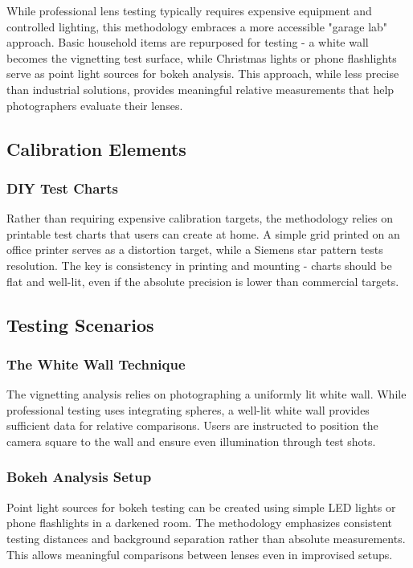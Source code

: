 While professional lens testing typically requires expensive equipment and controlled lighting, this methodology embraces a more accessible "garage lab" approach. Basic household items are repurposed for testing - a white wall becomes the vignetting test surface, while Christmas lights or phone flashlights serve as point light sources for bokeh analysis. This approach, while less precise than industrial solutions, provides meaningful relative measurements that help photographers evaluate their lenses.

\subsection{Calibration Elements}

\subsubsection{DIY Test Charts}
Rather than requiring expensive calibration targets, the methodology relies on printable test charts that users can create at home. A simple grid printed on an office printer serves as a distortion target, while a Siemens star pattern tests resolution. The key is consistency in printing and mounting - charts should be flat and well-lit, even if the absolute precision is lower than commercial targets.

\subsection{Testing Scenarios}

\subsubsection{The White Wall Technique}
The vignetting analysis relies on photographing a uniformly lit white wall. While professional testing uses integrating spheres, a well-lit white wall provides sufficient data for relative comparisons. Users are instructed to position the camera square to the wall and ensure even illumination through test shots.

\subsubsection{Bokeh Analysis Setup} 
Point light sources for bokeh testing can be created using simple LED lights or phone flashlights in a darkened room. The methodology emphasizes consistent testing distances and background separation rather than absolute measurements. This allows meaningful comparisons between lenses even in improvised setups.

